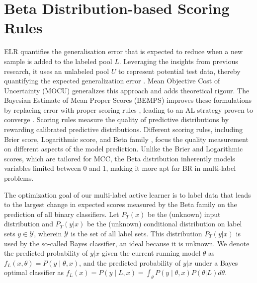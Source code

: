 \documentclass[letterpaper]{article} %
\begin{document}
\section{Beta Distribution-based Scoring Rules}
\label{sec:Method}

ELR \citep{roy2001toward} quantifies the generalisation error that is expected to reduce when a new sample is added to the labeled pool $L$.
Leveraging the insights from previous research, it uses an unlabeled pool $U$ to represent potential test data, thereby quantifying the expected generalization error \citep{settles2009active}.
Mean Objective Cost of Uncertainty (MOCU) \cite{zhao2020uncertainty} generalizes this approach and adds theoretical rigour.
The Bayesian Estimate of Mean Proper Scores (BEMPS) improves these formulations by replacing error with proper scoring rules \citep{doi:10.1198/016214506000001437}, leading to an AL strategy proven to converge  \citep{TanDuBun-IEEEPAMI23}.
Scoring rules measure the quality of predictive distributions by rewarding calibrated predictive distributions.
Different scoring rules, including Brier score,
Logarithmic score, and Beta family \cite{doi:10.1198/016214506000001437},
focus the quality measurement on different aspects of the model prediction.
Unlike the Brier and Logarithmic scores, which are tailored for MCC, the Beta distribution inherently models variables limited between 0 and 1, making it more apt for BR in multi-label problems.

The optimization goal of our multi-label active learner is to
label data that
leads to the largest change in expected scores
measured by the Beta family on the prediction of all binary classifiers.
Let $P_T(x)$ be the (unknown) input distribution and
$P_T(y|x)$ be the (unknown) conditional distribution on label sets
$y\in \mathcal{Y}$, wherein $\mathcal{Y}$ is the set of all label sets.
This distribution $P_T(y|x)$ is used by the so-called Bayes classifier, an ideal because it is unknown.
We denote the predicted probability of $y|x$ given the current running model $\theta$ as $f_L(x,\theta)=P(y \mid \theta,x)$,
and
the predicted probability of $y|x$ under a Bayes optimal classifier
as $f_{L}(x)=P(y\mid L,x)=\int_\theta P(y \mid \theta,x) P(\theta|L) d\theta$.
\end{document}

